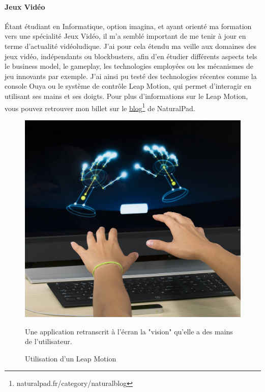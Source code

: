 \paragraph{Jeux Vidéo\\ \quad}
Étant étudiant en Informatique, option \gls{imagina}, et ayant orienté ma formation vers une spécialité Jeux Vidéo, il m'a semblé important de me tenir à jour en terme d'actualité vidéoludique. J'ai pour cela étendu ma veille aux domaines des jeux vidéo, indépendants ou blockbusters, afin d'en étudier différents aspects tels le business model, le gameplay, les technologies employées ou les mécanismes de jeu innovants par exemple. J'ai ainsi pu testé des technologies récentes comme la console Ouya ou le système de contrôle Leap Motion, qui permet d'interagir en utilisant ses mains et ses doigts. Pour plus d'informations sur le Leap Motion, vous pouvez retrouver mon billet sur le \href{naturalpad.fr/category/naturalblog}{blog}\footnote{naturalpad.fr/category/naturalblog} de NaturalPad.
\begin{figure}
	\centering
	\includegraphics{images/leap_motion.jpg}
	\caption{Utilisation d'un Leap Motion}Une application retranscrit à l'écran la "vision" qu'elle a des mains de l'utilisateur.
	\label{leapmotion}
\end{figure}

